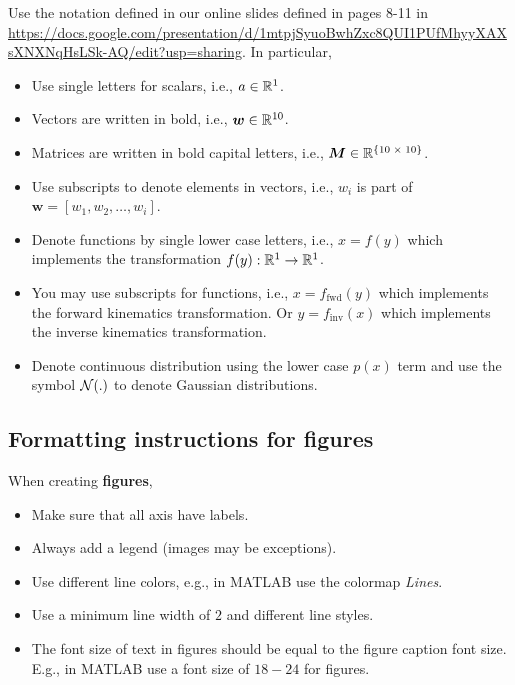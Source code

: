 \documentclass[10pt, a4paper, twocolumn]{article} %
\begin{document}
Use the notation defined in our online slides defined in pages 8-11 in \url{https://docs.google.com/presentation/d/1mtpjSyuoBwhZxc8QUI1PUfMhyyXAXsXNXNqHsLSk-AQ/edit?usp=sharing}. In particular,  
\begin{itemize}
\item Use single letters for scalars, i.e., $a \in {\mathbb{R}}^1$.  
\item Vectors are written in bold, i.e., $\bm w \in {\mathbb{R}}^{10}$.
\item Matrices are written in bold capital letters, i.e., $\bm M \in {\mathbb{R}}^{\{10\;\times\;10\}}$. 
\item Use subscripts to denote elements in vectors, i.e., $w_i$ is part of $\bm w = [w_1, w_2, \dots, w_i]$.
\item Denote functions by single lower case letters, i.e., $x = f(y)$ which implements the transformation $f(y): {\mathbb{R}}^1 \rightarrow {\mathbb{R}}^1$.
\item You may use subscripts for functions, i.e., $x = f_{\textrm{fwd}}(y)$ which implements the forward kinematics transformation. Or $y = f_{\textrm{inv}}(x)$ which implements the inverse kinematics transformation. 
\item Denote continuous distribution using the lower case $p(x)$ term and use the symbol $\mathcal{N}(.)$ to denote Gaussian distributions. 
\end{itemize}

\subsection{Formatting instructions for figures}

When creating \textbf{figures}, 
\begin{itemize}
\item Make sure that all axis have labels. 
\item Always add a legend (images may be exceptions).
\item Use different line colors, e.g., in MATLAB use the colormap \textit{Lines}. 
\item Use a minimum line width of $2$ and different line styles. 
\item The font size of text in figures should be equal to the figure caption font size. E.g., in MATLAB use a font size of $18-24$ for figures.\end{itemize} 
\end{document}
